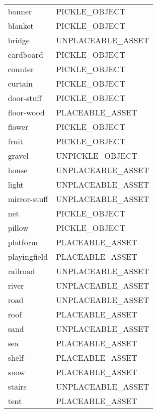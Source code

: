\begin{supertabular}{|l|l|}
  banner                & \tiny{PICKLE\_OBJECT    } \\
  blanket               & \tiny{PICKLE\_OBJECT    } \\
  bridge                & \tiny{UNPLACEABLE\_ASSET} \\
  cardboard             & \tiny{PICKLE\_OBJECT    } \\
  counter               & \tiny{PICKLE\_OBJECT    } \\
  curtain               & \tiny{PICKLE\_OBJECT    } \\
  door-stuff            & \tiny{PICKLE\_OBJECT    } \\
  floor-wood            & \tiny{PLACEABLE\_ASSET  } \\
  flower                & \tiny{PICKLE\_OBJECT    } \\
  fruit                 & \tiny{PICKLE\_OBJECT    } \\
  gravel                & \tiny{UNPICKLE\_OBJECT  } \\
  house                 & \tiny{UNPLACEABLE\_ASSET} \\
  light                 & \tiny{UNPLACEABLE\_ASSET} \\
  mirror-stuff          & \tiny{UNPLACEABLE\_ASSET} \\
  net                   & \tiny{PICKLE\_OBJECT    } \\
  pillow                & \tiny{PICKLE\_OBJECT    } \\
  platform              & \tiny{PLACEABLE\_ASSET  } \\
  playingfield          & \tiny{PLACEABLE\_ASSET  } \\
  railroad              & \tiny{UNPLACEABLE\_ASSET} \\
  river                 & \tiny{UNPLACEABLE\_ASSET} \\
  road                  & \tiny{UNPLACEABLE\_ASSET} \\
  roof                  & \tiny{PLACEABLE\_ASSET  } \\
  sand                  & \tiny{UNPLACEABLE\_ASSET} \\
  sea                   & \tiny{PLACEABLE\_ASSET  } \\
  shelf                 & \tiny{PLACEABLE\_ASSET  } \\
  snow                  & \tiny{PLACEABLE\_ASSET  } \\
  stairs                & \tiny{UNPLACEABLE\_ASSET} \\
  tent                  & \tiny{PLACEABLE\_ASSET  } \\

\end{supertabular}

